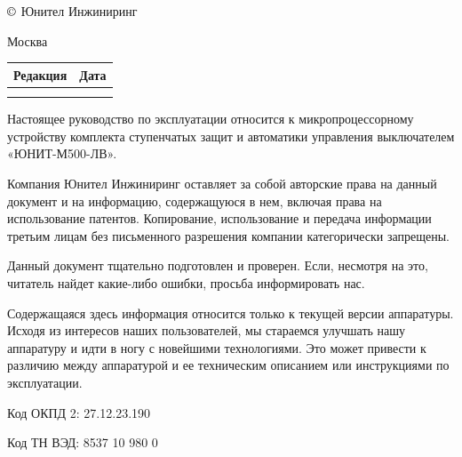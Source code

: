 \pagestyle{fancy}
\fancyhf{}
\renewcommand{\headrulewidth}{1pt}
\rhead{\colondevicetype}
\lhead{\color{red}{ЮТКБ.656122.609 РЭ6 Редакция \rev~от~\revdate}}
\rfoot{{\thepage}}
\renewcommand{\footrulewidth}{1pt}


\pagecolor{white}

\begin{flushleft}
\noindent
$\copyright$
\the\year{}
Юнител Инжиниринг

\vskip 3mm
Москва
\vskip 8mm

\setlength{\extrarowheight}{0.4cm} %
\begin{longtable}[l]{|>{\centering}m{4cm}|>{\centering\arraybackslash}m{4cm}|}%
    \hline
	Редакция & Дата \\
    \hline
	\textcolor{unigray}{\rev} & \textcolor{unigray}{\revdate} \\
    \hline  
    &  \\
    \hline 
                        
\end{longtable}

\vskip 70mm
\noindent
Настоящее руководство по эксплуатации относится к микропроцессорному устройству комплекта ступенчатых защит и автоматики управления выключателем «ЮНИТ-М500-ЛВ».

\vskip 10mm
Компания Юнител Инжиниринг оставляет за собой авторские права на данный документ и на информацию, содержащуюся в нем, включая права на использование патентов. Копирование, использование и передача информации третьим лицам без письменного разрешения компании категорически запрещены.

\vskip 10mm
Данный документ тщательно подготовлен и проверен. Если, несмотря на это, читатель найдет какие-либо ошибки, просьба информировать нас.

\vskip 10mm
Содержащаяся здесь информация относится только к текущей версии аппаратуры. Исходя из интересов наших пользователей, мы стараемся улучшать нашу аппаратуру и идти в ногу с новейшими технологиями. Это может привести к различию между аппаратурой и ее техническим описанием или инструкциями по эксплуатации.

\vskip 10mm
Код ОКПД 2: 27.12.23.190 %

\vskip 5mm
Код ТН ВЭД: 8537 10 980 0 %

\end{flushleft}